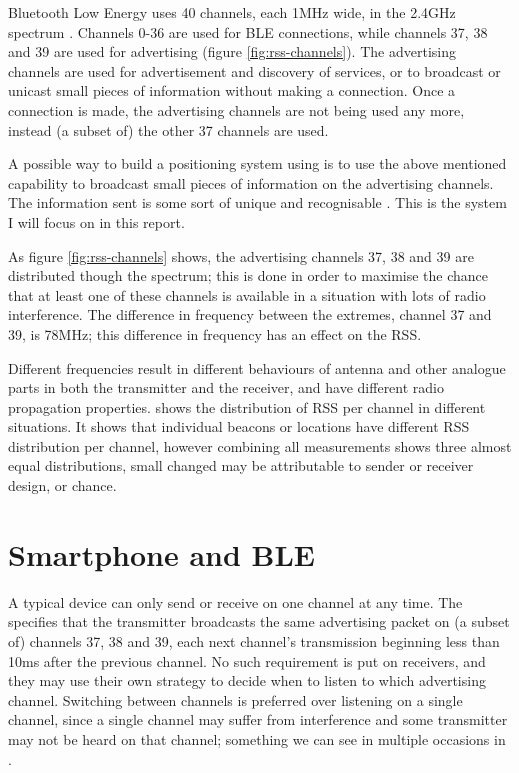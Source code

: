 Bluetooth Low Energy uses 40 channels, each 1MHz wide, in the 2.4GHz spectrum \citep{bluetooth40spec}.
Channels 0-36 are used for BLE connections, while channels 37, 38 and 39 are used for advertising (figure \ref{fig:rss-channels}).
The advertising channels are used for advertisement and discovery of services, or to broadcast or unicast small pieces of information without making a connection.
Once a connection is made, the advertising channels are not being used any more, instead (a subset of) the other 37 channels are used.

A possible way to build a positioning system using \BLE is to use the above mentioned capability to broadcast small pieces of information on the advertising channels.
The information sent is some sort of unique and recognisable \bid.
This is the system I will focus on in this report.

As figure \ref{fig:rss-channels} shows, the advertising channels 37, 38 and 39 are distributed though the spectrum; this is done in order to maximise the chance that at least one of these channels is available in a situation with lots of radio interference.
The difference in frequency between the extremes, channel 37 and 39, is 78MHz; this difference in frequency has an effect on the RSS.

Different frequencies result in different behaviours of antenna and other analogue parts in both the transmitter and the receiver, and have different radio propagation properties.
 shows the distribution of RSS per channel in different situations.
It shows that individual beacons or locations have different RSS distribution per channel, however combining all measurements shows three almost equal distributions, small changed may be attributable to sender or receiver design, or chance.

\section{Smartphone and BLE}
\label{sec:rss-smartphone}
A typical device can only send or receive on one channel at any time.
The \BTspec \citep{bluetooth40spec} specifies that the transmitter broadcasts the same advertising packet on (a subset of) channels 37, 38 and 39, each next channel's transmission beginning less than 10ms after the previous channel. 
No such requirement is put on receivers, and they may use their own strategy to decide when to listen to which advertising channel.
Switching between channels is preferred over listening on a single channel, since a single channel may suffer from interference and some transmitter may not be heard on that channel; something we can see in multiple occasions in .


